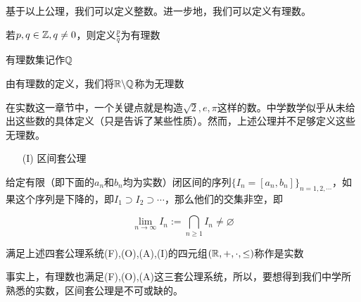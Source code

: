 基于以上公理，我们可以定义整数。进一步地，我们可以定义有理数。

\begin{definition}[有理数]
    若$p,q\in\mathbb{Z},q\neq0$，则定义$\displaystyle \frac{p}{q}$为有理数

    有理数集记作$\mathbb{Q}$
\end{definition}

由有理数的定义，我们将$\mathbb{R}\backslash\mathbb{Q}$称为无理数

在实数这一章节中，一个关键点就是构造$\sqrt{2},e,\pi$这样的数。中学数学似乎从未给出这些数的具体定义（只是告诉了某些性质）。然而，上述公理并不足够定义这些无理数。

\begin{itemize}
    \item[(I)] 区间套公理
\end{itemize}

给定有限（即下面的$a_n$和$b_n$均为实数）闭区间的序列$\{I_n = [a_n,b_n]\}_{n=1,2,\cdots}$，如果这个序列是下降的，即$I_1\supset I_2\supset \cdots$，那么他们的交集非空，即

\begin{equation*}
    \lim_{n\rightarrow \infty}I_n:=\bigcap_{n\geq 1}I_n\neq \varnothing
\end{equation*}

\begin{definition}[实数]
    满足上述四套公理系统(F),(O),(A),(I)的四元组$(\mathbb{R},+,\cdot,\leq)$称作是实数
\end{definition}

事实上，有理数也满足(F),(O),(A)这三套公理系统，所以，要想得到我们中学所熟悉的实数，区间套公理是不可或缺的。